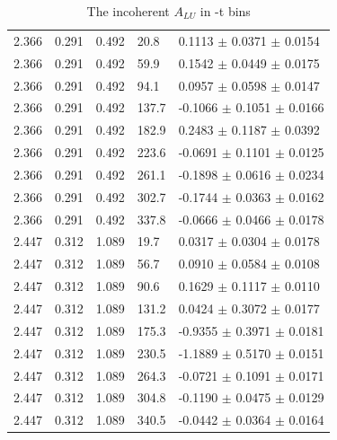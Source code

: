 \begin{table}[!h]
\begin{center}
\begin{tabular}{||l|l|l|l|l||}
  2.366 & 0.291 & 0.492  &   20.8  &  0.1113  $\pm$ 0.0371  $\pm$ 0.0154 \\
  2.366 & 0.291 & 0.492  &   59.9  &  0.1542  $\pm$ 0.0449  $\pm$ 0.0175 \\
  2.366 & 0.291 & 0.492  &   94.1  &  0.0957  $\pm$ 0.0598  $\pm$ 0.0147 \\
  2.366 & 0.291 & 0.492  &  137.7  & -0.1066  $\pm$ 0.1051  $\pm$ 0.0166 \\
  2.366 & 0.291 & 0.492  &  182.9  &  0.2483  $\pm$ 0.1187  $\pm$ 0.0392 \\
  2.366 & 0.291 & 0.492  &  223.6  & -0.0691  $\pm$ 0.1101  $\pm$ 0.0125 \\
  2.366 & 0.291 & 0.492  &  261.1  & -0.1898  $\pm$ 0.0616  $\pm$ 0.0234 \\
  2.366 & 0.291 & 0.492  &  302.7  & -0.1744  $\pm$ 0.0363  $\pm$ 0.0162 \\
  2.366 & 0.291 & 0.492  &  337.8  & -0.0666  $\pm$ 0.0466  $\pm$ 0.0178 \\
  \hline                                                              
                                                                           
  2.447 & 0.312 & 1.089  &  19.7   & 0.0317   $\pm$ 0.0304  $\pm$ 0.0178 \\
  2.447 & 0.312 & 1.089  &  56.7   & 0.0910   $\pm$ 0.0584  $\pm$ 0.0108 \\
  2.447 & 0.312 & 1.089  &  90.6   & 0.1629   $\pm$ 0.1117  $\pm$ 0.0110 \\
  2.447 & 0.312 & 1.089  & 131.2   & 0.0424   $\pm$ 0.3072  $\pm$ 0.0177 \\
  2.447 & 0.312 & 1.089  & 175.3   &-0.9355   $\pm$ 0.3971  $\pm$ 0.0181 \\
  2.447 & 0.312 & 1.089  & 230.5   &-1.1889   $\pm$ 0.5170  $\pm$ 0.0151 \\
  2.447 & 0.312 & 1.089  & 264.3   &-0.0721   $\pm$ 0.1091  $\pm$ 0.0171 \\
  2.447 & 0.312 & 1.089  & 304.8   &-0.1190   $\pm$ 0.0475  $\pm$ 0.0129 \\
  2.447 & 0.312 & 1.089  & 340.5   &-0.0442   $\pm$ 0.0364  $\pm$ 0.0164 \\

 \hline
 \hline
 \end{tabular}
 \caption{The incoherent $A_{LU}$ in -t bins}
 \label{table:InCoh_t_BSA}
 \end{center}
\end{table}

